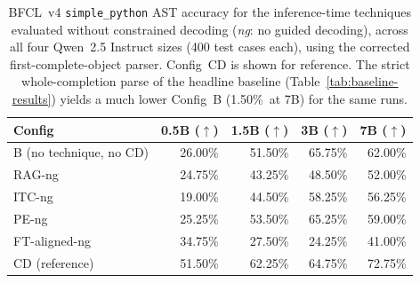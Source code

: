 %
%

\begin{table}[ht]
\centering
\caption{BFCL~v4 \texttt{simple\_python} AST accuracy for the
inference-time techniques evaluated without constrained decoding
(\textit{ng}: no guided decoding), across all four Qwen~2.5 Instruct
sizes (400 test cases each), using the corrected first-complete-object
parser. Config~CD is shown for reference. The strict whole-completion
parse of the headline baseline (Table~\ref{tab:baseline-results})
yields a much lower Config~B (1.50\%\ at 7B) for the same runs.}
\label{tab:isolation-sizes}
\begin{tabular}{lrrrr}
\toprule
Config & 0.5B ($\uparrow$) & 1.5B ($\uparrow$) & 3B ($\uparrow$) & 7B ($\uparrow$) \\
\midrule
B (no technique, no CD) & 26.00\% & 51.50\% & 65.75\% & 62.00\% \\
RAG-ng                  & 24.75\% & 43.25\% & 48.50\% & 52.00\% \\
ITC-ng                  & 19.00\% & 44.50\% & 58.25\% & 56.25\% \\
PE-ng                   & 25.25\% & 53.50\% & 65.25\% & 59.00\% \\
FT-aligned-ng           & 34.75\% & 27.50\% & 24.25\% & 41.00\% \\
\midrule
CD (reference)          & 51.50\% & 62.25\% & 64.75\% & 72.75\% \\
\bottomrule
\end{tabular}
\end{table}

